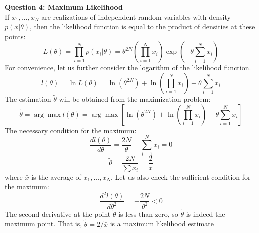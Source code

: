 \documentclass[12pt]{article}
\begin{document}
	\textbf{Question 4: Maximum Likelihood}\\
	If $x_1,...,x_N$ are realizations of independent random variables with density $p(x|\theta)$, then the likelihood function is equal to the product of densities at these points:
	$$L(\theta) = \prod_{i=1}^{N} p(x_i|\theta) = \theta^{2N}\left(\prod_{i=1}^{N}x_i\right)\exp\left(-\theta\sum_{i=1}^{N}x_i\right)$$
	For convenience, let us further consider the logarithm of the likelihood function.
	$$ l(\theta) = \ln L(\theta) = \ln \left(\theta^{2N}\right) + \ln\left(\prod_{i=1}^{N}x_i\right) -\theta\sum_{i=1}^{N}x_i $$
	The estimation $\tilde\theta$  will be obtained from the maximization problem:
	$$\tilde\theta = \arg \max l(\theta) = \arg\max\left[ \ln \left(\theta^{2N}\right) + \ln\left(\prod_{i=1}^{N}x_i\right) -\theta\sum_{i=1}^{N}x_i \right]$$
	The necessary condition for the maximum: 
	$$\frac{dl(\theta)}{d\theta} = \frac{2N}{\theta}-\sum_{i=1}^{N}x_i = 0$$
	$$\tilde\theta = \frac{2N}{\sum x_i} = \frac{2}{\bar x}$$
	where $\bar x$ is the average of $x_1,...,x_N$.
	Let us also check the sufficient condition for the maximum:
	$$\frac{d^2 l(\theta)}{d\theta^2} =- \frac{2N}{\theta^2} < 0$$
	The second derivative at the point $\tilde{\theta}$ is less than zero, so $\tilde{\theta}$ is indeed the maximum point. That is, 	$\tilde\theta  = 2/\bar x$ is a maximum likelihood estimate
\end{document}
